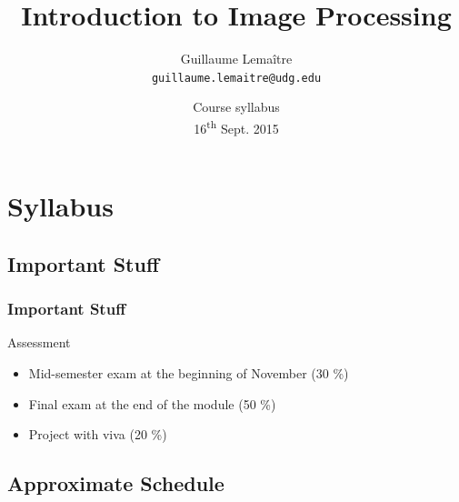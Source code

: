 \documentclass{beamer}
\title{Introduction to Image Processing}
\author{Guillaume Lema\^itre \\ \texttt{guillaume.lemaitre@udg.edu}}
\date{Course syllabus \\ 16\textsuperscript{th} Sept. 2015}
\institute{Universit\'e de Bourgogne}
\begin{document}
\begin{frame}
  \titlepage
\end{frame}

\begin{frame}
  \tableofcontents[sectionstyle=show,subsectionstyle=show,subsubsectionstyle=hide]
\end{frame}

\section{Syllabus}

\subsection{Important Stuff}

\begin{frame}
  \frametitle{Important Stuff}
  \begin{block}{Assessment}
    \begin{itemize}
    \item Mid-semester exam at the beginning of November (30 \%)
    \item Final exam at the end of the module (50 \%)
    \item Project with viva (20 \%)
    \end{itemize}
  \end{block}
\end{frame}

\subsection{Approximate Schedule}
\end{document}
